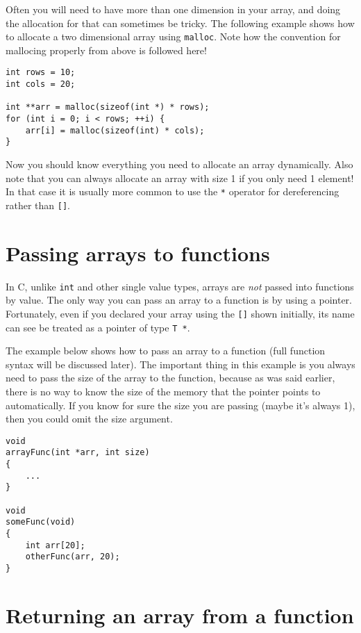 Often you will need to have more than one dimension in your array, and doing the allocation for that can sometimes be tricky.
The following example shows how to allocate a two dimensional array using \texttt{malloc}.
Note how the convention for mallocing properly from above is followed here! 

\begin{lstlisting}
int rows = 10;
int cols = 20;

int **arr = malloc(sizeof(int *) * rows);
for (int i = 0; i < rows; ++i) {
    arr[i] = malloc(sizeof(int) * cols);
}
\end{lstlisting}

Now you should know everything you need to allocate an array dynamically.
Also note that you can always allocate an array with size 1 if you only need 1 element!
In that case it is usually more common to use the \texttt{*} operator for dereferencing rather than \texttt{[]}.

\section{Passing arrays to functions}

In C, unlike \texttt{int} and other single value types, arrays are \emph{not} passed into functions by value.
The only way you can pass an array to a function is by using a pointer.
Fortunately, even if you declared your array using the \texttt{[]} shown initially, its name can see be treated as a pointer of type \texttt{T *}.

The example below shows how to pass an array to a function (full function syntax will be discussed later).
The important thing in this example is you always need to pass the size of the array to the function, because as was said earlier, there is no way to know the size of the memory that the pointer points to automatically.
If you know for sure the size you are passing (maybe it's always 1), then you could omit the size argument.

\begin{lstlisting}
void
arrayFunc(int *arr, int size)
{
    ...
}

void
someFunc(void)
{
    int arr[20];
    otherFunc(arr, 20);
}
\end{lstlisting}

\section{Returning an array from a function}

